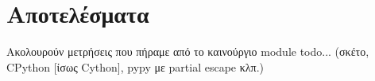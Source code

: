 
\chapter{Αποτελέσματα}
\label{chapter5}

Ακολουρούν μετρήσεις που πήραμε από το καινούργιο module todo...
(σκέτο, CPython [ίσως Cython], pypy με partial escape κλπ.)

